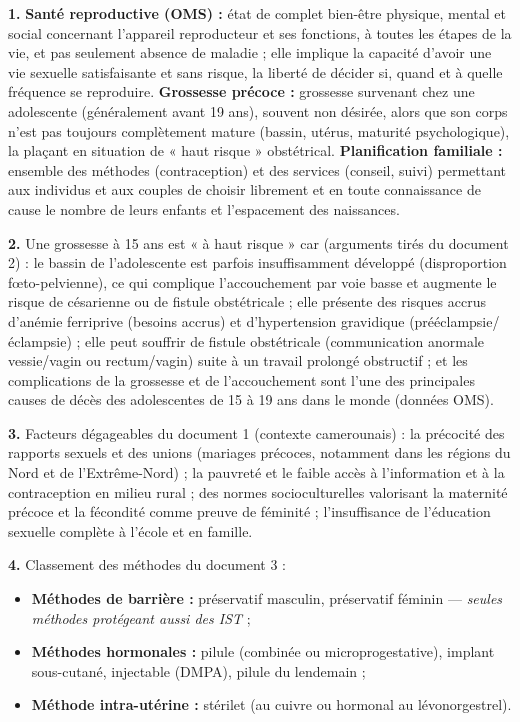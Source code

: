 \documentclass[11pt]{article}
\begin{document}
\begin{corrige}

\textbf{1.} \textbf{Santé reproductive (OMS) :} état de complet bien-être physique, mental et social concernant l'appareil reproducteur et ses fonctions, à toutes les étapes de la vie, et pas seulement absence de maladie ; elle implique la capacité d'avoir une vie sexuelle satisfaisante et sans risque, la liberté de décider si, quand et à quelle fréquence se reproduire. \textbf{Grossesse précoce :} grossesse survenant chez une adolescente (généralement avant 19 ans), souvent non désirée, alors que son corps n'est pas toujours complètement mature (bassin, utérus, maturité psychologique), la plaçant en situation de « haut risque » obstétrical. \textbf{Planification familiale :} ensemble des méthodes (contraception) et des services (conseil, suivi) permettant aux individus et aux couples de choisir librement et en toute connaissance de cause le nombre de leurs enfants et l'espacement des naissances.

\textbf{2.} Une grossesse à 15 ans est « à haut risque » car (arguments tirés du document 2) : le bassin de l'adolescente est parfois insuffisamment développé (disproportion fœto-pelvienne), ce qui complique l'accouchement par voie basse et augmente le risque de césarienne ou de fistule obstétricale ; elle présente des risques accrus d'anémie ferriprive (besoins accrus) et d'hypertension gravidique (prééclampsie/éclampsie) ; elle peut souffrir de fistule obstétricale (communication anormale vessie/vagin ou rectum/vagin) suite à un travail prolongé obstructif ; et les complications de la grossesse et de l'accouchement sont l'une des principales causes de décès des adolescentes de 15 à 19 ans dans le monde (données OMS).

\textbf{3.} Facteurs dégageables du document 1 (contexte camerounais) : la précocité des rapports sexuels et des unions (mariages précoces, notamment dans les régions du Nord et de l'Extrême-Nord) ; la pauvreté et le faible accès à l'information et à la contraception en milieu rural ; des normes socioculturelles valorisant la maternité précoce et la fécondité comme preuve de féminité ; l'insuffisance de l'éducation sexuelle complète à l'école et en famille.

\textbf{4.} Classement des méthodes du document 3 :
\begin{itemize}
\item \textbf{Méthodes de barrière :} préservatif masculin, préservatif féminin — \emph{seules méthodes protégeant aussi des IST} ;
\item \textbf{Méthodes hormonales :} pilule (combinée ou microprogestative), implant sous-cutané, injectable (DMPA), pilule du lendemain ;
\item \textbf{Méthode intra-utérine :} stérilet (au cuivre ou hormonal au lévonorgestrel).
\end{itemize}


\end{corrige}
\end{document}
